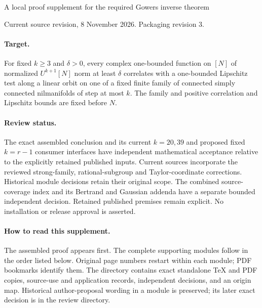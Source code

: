 \documentclass[11pt]{article}
\begin{document}
\begin{center}\LARGE A local proof supplement for the required Gowers inverse theorem\end{center}
\noindent Current source revision, 8 November 2026. Packaging revision 3.
\paragraph{Target.} For fixed $k\geq3$ and $\delta>0$, every complex one-bounded function on $[N]$ of normalized $U^{k+1}[N]$ norm at least $\delta$ correlates with a one-bounded Lipschitz test along a linear orbit on one of a fixed finite family of connected simply connected nilmanifolds of step at most $k$. The family and positive correlation and Lipschitz bounds are fixed before $N$.
\paragraph{Review status.} The exact assembled conclusion and its current $k=20,39$ and proposed fixed $k=r-1$ consumer interfaces have independent mathematical acceptance relative to the explicitly retained published inputs. Current sources incorporate the reviewed strong-family, rational-subgroup and Taylor-coordinate corrections. Historical module decisions retain their original scope. The combined source-coverage index and its Bertrand and Gaussian addenda have a separate bounded independent decision. Retained published premises remain explicit. No installation or release approval is asserted.
\paragraph{How to read this supplement.} The assembled proof appears first. The complete supporting modules follow in the order listed below. Original page numbers restart within each module; PDF bookmarks identify them. The directory contains exact standalone TeX and PDF copies, source-use and application records, independent decisions, and an origin map. Historical author-proposal wording in a module is preserved; its later exact decision is in the review directory.
\end{document}
